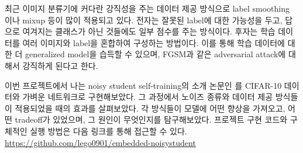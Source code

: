 최근 이미지 분류기에 커다란 강직성을 주는 데이터 제공 방식으로 label smoothing \cite{szegedy2015rethinking} 이나 mixup \cite{zhang2018mixup} 등이 많이 적용되고 있다. 전자는 잘못된 label에 대한 가능성을 두고, 답으로 여겨지는 클래스가 아닌 것들에도 일부 점수를 주는 방식이다. 후자는 학습 데이터를 여러 이미지와 label을 혼합하여 구성하는 방법이다. 이를 통해 학습 데이터에 대한 더 generalized model을 습득할 수 있으며, FGSM과 같은 adversarial attack에 대해서 강직하게 된다고 한다. \cite{zhang2018mixup}

이번 프로젝트에서 나는 noisy student self-training의 소개 논문인 \cite{xie2020selftraining}를 CIFAR-10 데이터와 가벼운 네트워크로 구현해보았다. 그 과정에서 노이즈 종류와 데이터 제공 방식들이 적용되었을 때의 효과를 살펴보았다. 각 방식들이 모델에 어떤 향상을 가져오고, 어떤 tradeoff가 있었으며, 그 원인이 무엇인지를 탐구해보았다. 프로젝트 구현 코드와 구체적인 실행 방법은 다음 링크를 통해 접근할 수 있다. \\ \url{https://github.com/lego0901/embedded-noisystudent}